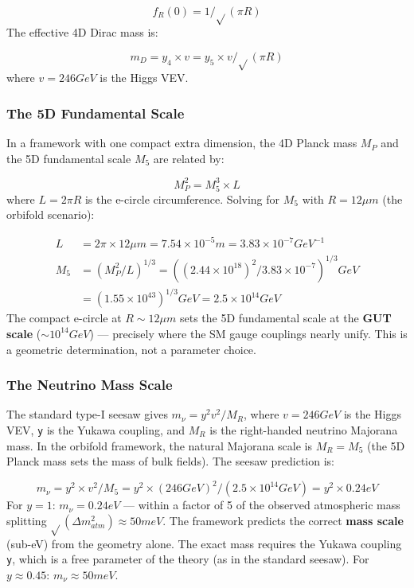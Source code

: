 \documentclass[aps,prd,preprint,superscriptaddress,longbibliography,floatfix]{revtex4-2}
\theoremstyle{remark}
\begin{document}
\begin{equation}
    f_R(0) = 1/\sqrt{}(\pi R)
\end{equation}
The effective 4D Dirac mass is:


\begin{equation}
    m_D = y_{4} \times v = y_{5} \times v / \sqrt{}(\pi R)
\end{equation}
where $v = 246 GeV$ is the Higgs VEV.


\subsubsection{The 5D Fundamental Scale}

In a framework with one compact extra dimension, the 4D Planck mass $M_P$ and the 5D fundamental scale $M_{5}$ are related by:


\begin{equation}
    M_P^{2} = M_{5}^{3} \times L
\end{equation}
where $L = 2\pi R$ is the e-circle circumference. Solving for $M_{5}$ with $R = 12 \mu m$ (the orbifold scenario):


\begin{align}
    L &= 2\pi \times 12 \mu m = 7.54 \times 10^{-5} m = 3.83 \times 10^{-7} GeV^{-1} \\
    M_{5} &= (M_P^{2} / L)^{1/3} = ((2.44 \times 10^{18})^{2} / 3.83 \times 10^{-7})^{1/3} GeV \\
    & = (1.55 \times 10^{43})^{1/3} GeV = 2.5 \times 10^{14} GeV
\end{align}
The compact e-circle at $R \sim  12 \mu m$ sets the 5D fundamental scale at the \textbf{GUT scale} ($\sim 10^{14} GeV$) --- precisely where the SM gauge couplings nearly unify. This is a geometric determination, not a parameter choice.


\subsubsection{The Neutrino Mass Scale}

The standard type-I seesaw gives $m_\nu = y^{2} v^{2} / M_R$, where $v = 246 GeV$ is the Higgs VEV, \texttt{y} is the Yukawa coupling, and $M_R$ is the right-handed neutrino Majorana mass. In the orbifold framework, the natural Majorana scale is $M_R = M_{5}$ (the 5D Planck mass sets the mass of bulk fields). The seesaw prediction is:


\begin{equation}
    m_\nu = y^{2} \times v^{2} / M_{5} = y^{2} \times (246 GeV)^{2} / (2.5 \times 10^{14} GeV) = y^{2} \times 0.24 eV
\end{equation}
For $y = 1$: $m_\nu = 0.24 eV$ --- within a factor of 5 of the observed atmospheric mass splitting $\sqrt{}(\Delta m^{2}_{atm}) \approx 50 meV$. The framework predicts the correct \textbf{mass scale} (sub-eV) from the geometry alone. The exact mass requires the Yukawa coupling \texttt{y}, which is a free parameter of the theory (as in the standard seesaw). For $y \approx 0.45$: $m_\nu \approx 50 meV$.
\end{document}
